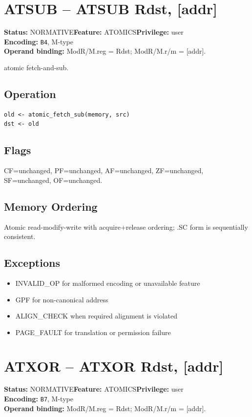 \documentclass[10pt]{article}
\begin{document}
\section{ATSUB -- ATSUB Rdst, [addr]}
\textbf{Status:} NORMATIVE\quad \textbf{Feature:} ATOMICS\quad \textbf{Privilege:} user\\
\textbf{Encoding:} \texttt{B4}, M-type\\
\textbf{Operand binding:} ModR/M.reg = Rdst; ModR/M.r/m = [addr].

atomic fetch-and-sub.

\subsection*{Operation}
\begin{lstlisting}
old <- atomic_fetch_sub(memory, src)
dst <- old
\end{lstlisting}
\subsection*{Flags}
CF=unchanged, PF=unchanged, AF=unchanged, ZF=unchanged, SF=unchanged, OF=unchanged.
\subsection*{Memory Ordering}
Atomic read-modify-write with acquire+release ordering; .SC form is sequentially consistent.
\subsection*{Exceptions}
\begin{itemize}
\item INVALID\_OP for malformed encoding or unavailable feature
\item GPF for non-canonical address
\item ALIGN\_CHECK when required alignment is violated
\item PAGE\_FAULT for translation or permission failure
\end{itemize}
\clearpage

\section{ATXOR -- ATXOR Rdst, [addr]}
\textbf{Status:} NORMATIVE\quad \textbf{Feature:} ATOMICS\quad \textbf{Privilege:} user\\
\textbf{Encoding:} \texttt{B7}, M-type\\
\textbf{Operand binding:} ModR/M.reg = Rdst; ModR/M.r/m = [addr].
\end{document}

